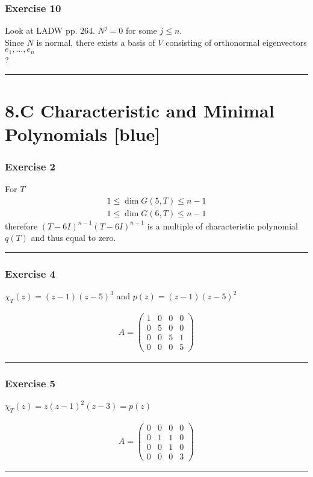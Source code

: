 \documentclass[12pt, letterpaper]{scrartcl}
\begin{document}

\subsubsection*{Exercise 10}
Look at LADW pp. 264.
$N^j=0$ for some $j\leq n$.\\
Since $N$ is normal, there exists a basis of $V$ consisting of orthonormal eigenvectors $e_1, \dots, e_n$
\\?
\vskip1mm\hrule

\section*{8.C Characteristic and Minimal Polynomials \xrfill[2pt]{3pt}[blue]}

\subsubsection*{Exercise 2}
For $T$
\begin{align*}
    1 \leq \dim G(5,T) \leq n-1\\
    1 \leq \dim G(6,T) \leq n-1
\end{align*}
therefore $(T-6I)^{n-1}(T-6I)^{n-1}$ is a multiple of characteristic polynomial $q(T)$ and thus equal to zero.
\vskip1mm\hrule

\subsubsection*{Exercise 4}
\begin{center}
$\chi_T(z)=(z-1)(z-5)^3$ and $p(z)=(z-1)(z-5)^2$
\end{center}
\begin{align*}
     A=
     \left(
     \begin{array}{cccc}
          1&0&0&0\\
          0&5&0&0\\
          0&0&5&1\\
          0&0&0&5
     \end{array}
     \right)
\end{align*}
\vskip1mm\hrule

\subsubsection*{Exercise 5}
\begin{center}
$\chi_T(z)=z(z-1)^2(z-3)=p(z)$
\end{center}
\begin{align*}
     A=
     \left(
     \begin{array}{cccc}
          0&0&0&0\\
          0&1&1&0\\
          0&0&1&0\\
          0&0&0&3
     \end{array}
     \right)
\end{align*}
\vskip1mm\hrule
\end{document}
